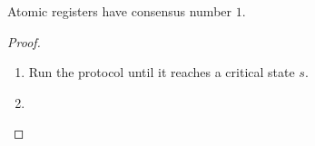 \begin{frame}{}
  \begin{theorem}
    Atomic registers have consensus number $1$.
  \end{theorem}

  \begin{proof}
    \begin{enumerate}[(1)]
      \item Run the protocol until it reaches a critical state $s$.
      \item {}
    \end{enumerate}
  \end{proof}
\end{frame}

\begin{frame}{}
\end{frame}

\begin{frame}{}
\end{frame}

\begin{frame}{}
\end{frame}

\begin{frame}{}
  \begin{theorem}
  \end{theorem}
\end{frame}
